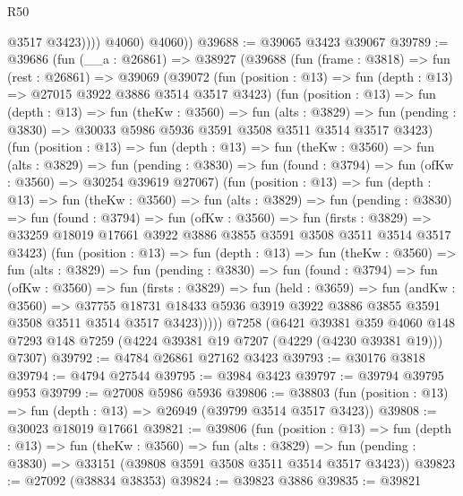 \begin{lexlean}{R50}
\begin{coremodule}
                  @3517
                  @3423))))
          @4060)
        @4060))
@39688 := @39065 @3423 @39067
@39789 := @39686
    (fun (__a : @26861) =>
    @38927
      (@39688
        (fun (frame : @3818) =>
        fun (rest : @26861) =>
        @39069
          (@39072
            (fun (position : @13) => fun (depth : @13) => @27015 @3922 @3886 @3514 @3517 @3423)
            (fun (position : @13) =>
            fun (depth : @13) =>
            fun (theKw : @3560) =>
            fun (alts : @3829) =>
            fun (pending : @3830) => @30033 @5986 @5936 @3591 @3508 @3511 @3514 @3517 @3423)
            (fun (position : @13) =>
            fun (depth : @13) =>
            fun (theKw : @3560) =>
            fun (alts : @3829) =>
            fun (pending : @3830) =>
            fun (found : @3794) => fun (ofKw : @3560) => @30254 @39619 @27067)
            (fun (position : @13) =>
            fun (depth : @13) =>
            fun (theKw : @3560) =>
            fun (alts : @3829) =>
            fun (pending : @3830) =>
            fun (found : @3794) =>
            fun (ofKw : @3560) =>
            fun (firsts : @3829) =>
            @33259 @18019 @17661 @3922 @3886 @3855 @3591 @3508 @3511 @3514 @3517 @3423)
            (fun (position : @13) =>
            fun (depth : @13) =>
            fun (theKw : @3560) =>
            fun (alts : @3829) =>
            fun (pending : @3830) =>
            fun (found : @3794) =>
            fun (ofKw : @3560) =>
            fun (firsts : @3829) =>
            fun (held : @3659) =>
            fun (andKw : @3560) =>
            @37755
              @18731
              @18433
              @5936
              @3919
              @3922
              @3886
              @3855
              @3591
              @3508
              @3511
              @3514
              @3517
              @3423)))))
    @7258
    (@6421
      @39381
      @359
      @4060
      @148
      @7293
      @148
      @7259
      (@4224 @39381 @19 @7207 (@4229 (@4230 @39381 @19)))
      @7307)
@39792 := @4784 @26861 @27162 @3423
@39793 := @30176 @3818
@39794 := @4794 @27544
@39795 := @3984 @3423
@39797 := @39794 @39795 @953
@39799 := @27008 @5986 @5936
@39806 := @38803 (fun (position : @13) => fun (depth : @13) => @26949 (@39799 @3514 @3517 @3423))
@39808 := @30023 @18019 @17661
@39821 := @39806
    (fun (position : @13) =>
    fun (depth : @13) =>
    fun (theKw : @3560) =>
    fun (alts : @3829) =>
    fun (pending : @3830) => @33151 (@39808 @3591 @3508 @3511 @3514 @3517 @3423))
@39823 := @27092 (@38834 @38353)
@39824 := @39823 @3886
@39835 := @39821

\end{coremodule}
\end{lexlean}
